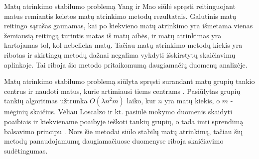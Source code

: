 


Matų atrinkimo stabilumo problemą Yang ir Mao \cite{yang2011robust} siūlė spręsti reitinguojant matus remiantis keletos matų atrinkimo metodų rezultatais. Galutinis matų reitingo sąrašas gaunamas, kai po kiekvieno matų atrinkimo yra išmetama vienas žemiausią reitingą turintis matas iš matų aibės, ir matų atrinkimas yra kartojamas tol, kol nebelieka matų. Tačiau matų atrinkimo metodų kiekis yra ribotas ir skirtingų metodų dažnai negalima vykdyti išskirstytų skaičiavimų aplinkoje. Tai riboja šio metodo pritaikomumą daugiamačių duomenų analizėje.

Matų atrinkimo stabilumo problemą siūlyta spręsti surandant matų grupių tankio centrus ir naudoti matus, kurie artimiausi tiems centrams \cite{yu2008stable}. Pasiūlytas grupių tankių algoritmas užtrunka $O(\lambda n^2m)$ laiko, kur $n$ yra matų kiekis, o $m$ - mėginių skaičius. Vėliau Loscalzo ir kt. pasiūlė mokymo duomenis skaidyti poaibiais ir kiekviename poaibyje ieškoti tankių grupių, o tada imti sprendimą balsavimo principu \cite{loscalzo2009consensus}. Nors šie metodai siūlo stabilų matų atrinkimą, tačiau šių metodų panaudojamumą daugiamačiuose duomenyse riboja skaičiavimo sudėtingumas.

